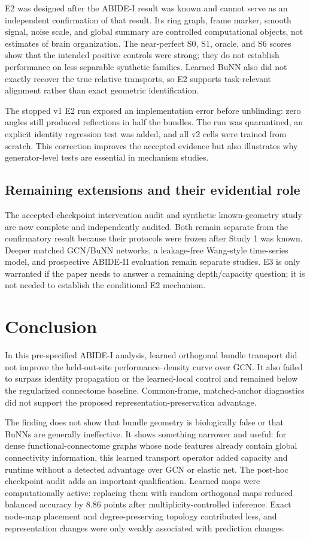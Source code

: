 \documentclass[11pt,a4paper]{article}
\begin{document}
E2 was designed after the ABIDE-I result was known and cannot serve as an
independent confirmation of that result. Its ring graph, frame marker, smooth
signal, noise scale, and global summary are controlled computational objects,
not estimates of brain organization. The near-perfect S0, S1, oracle, and S6
scores show that the intended positive controls were strong; they do not
establish performance on less separable synthetic families. Learned BuNN also
did not exactly recover the true relative transports, so E2 supports
task-relevant alignment rather than exact geometric identification.

The stopped v1 E2 run exposed an implementation error before unblinding: zero
angles still produced reflections in half the bundles. The run was quarantined,
an explicit identity regression test was added, and all v2 cells were trained
from scratch. This correction improves the accepted evidence but also
illustrates why generator-level tests are essential in mechanism studies.

\subsection{Remaining extensions and their evidential role}

The accepted-checkpoint intervention audit and synthetic known-geometry study
are now complete and independently audited. Both remain separate from the
confirmatory result because their protocols were frozen after Study 1 was
known. Deeper matched GCN/BuNN networks, a leakage-free Wang-style time-series
model, and prospective ABIDE-II evaluation remain separate studies. E3 is only
warranted if the paper needs to answer a remaining depth/capacity question; it
is not needed to establish the conditional E2 mechanism.

\section{Conclusion}

In this pre-specified ABIDE-I analysis, learned orthogonal bundle transport did
not improve the held-out-site performance--density curve over GCN. It also
failed to surpass identity propagation or the learned-local control and
remained below the regularized connectome baseline. Common-frame,
matched-anchor diagnostics did not support the proposed
representation-preservation advantage.

The finding does not show that bundle geometry is biologically false or that
BuNNs are generally ineffective. It shows something narrower and useful:
for dense functional-connectome graphs whose node features already contain
global connectivity information, this learned transport operator added
capacity and runtime without a detected advantage over GCN or elastic net.
The post-hoc checkpoint audit adds an important qualification. Learned maps
were computationally active: replacing them with random orthogonal maps
reduced balanced accuracy by 8.86 points after multiplicity-controlled
inference. Exact node-map placement and degree-preserving topology contributed
less, and representation changes were only weakly associated with prediction
changes.
\end{document}
